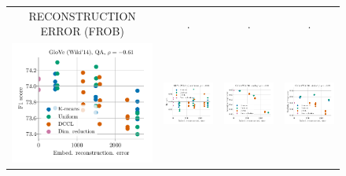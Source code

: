 \begin{figure}
\begin{tabular}{@{\hskip -0.0in}c@{\hskip -0.0in}c@{\hskip -0.0in}c@{\hskip -0.0in}c@{\hskip -0.0in}}
		RECONSTRUCTION ERROR (FROB) & . & . & . \\		
		\includegraphics[width=.245\linewidth]{figures/glove400k_qa_best-f1_vs_embed-frob-error_linx.pdf} &
		\includegraphics[width=.245\linewidth]{figures/glove400k_sentiment_trec_test-acc_vs_embed-frob-error_linx.pdf} &
		\includegraphics[width=.245\linewidth]{figures/glove400k_intrinsics_analogy-avg-score_vs_embed-frob-error_linx.pdf} &
		\includegraphics[width=.245\linewidth]{figures/glove400k_intrinsics_similarity-avg-score_vs_embed-frob-error_linx.pdf} \\
		
		
		

\end{tabular}
\end{figure}
